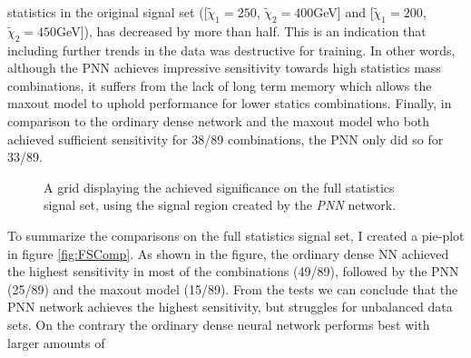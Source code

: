 statistics in the original signal set ([$\tilde{\chi}_1=250$, $\tilde{\chi}_2=400$GeV] and [$\tilde{\chi}_1=200$, $\tilde{\chi}_2=450$GeV]), has decreased by more than half.
This is an indication that including further trends in the data was destructive for training. In other words, although the \ac{PNN} achieves impressive sensitivity towards high 
statistics mass combinations, it suffers from the lack of long term memory which allows the maxout model to uphold performance for lower statics combinations. 
Finally, in comparison to the ordinary dense network and the maxout model who both achieved sufficient sensitivity for 38/89 combinations, the \ac{PNN} only did so for 33/89.\\
\begin{figure}
    \caption{A grid displaying the achieved significance on the full statistics signal set, using the signal region 
    created by the \emph{PNN} network.}
    \label{fig:PNNPCA_FS_MLMGridSig}
\end{figure}
To summarize the comparisons on the full statistics signal set, I created a pie-plot in figure \ref{fig:FSComp}. As shown in the figure, the ordinary dense \ac{NN}
achieved the highest sensitivity in most of the combinations (49/89), followed by the \ac{PNN} (25/89) and the maxout model (15/89). From the tests we can conclude that 
the \ac{PNN} network achieves the highest sensitivity, but struggles for unbalanced data sets. On the contrary the ordinary dense neural network performs best with larger amounts of 

